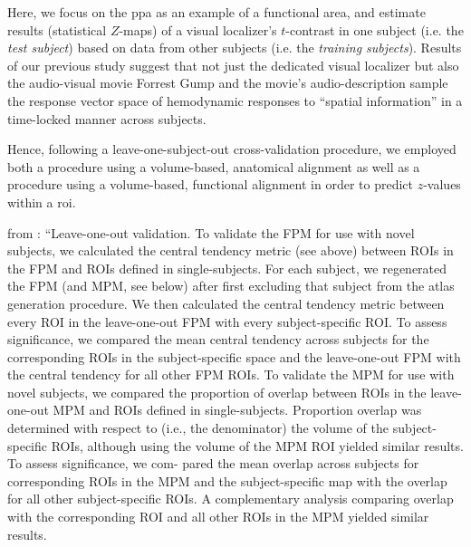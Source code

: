 

Here, we focus on the \ac{ppa} as an example of a functional area, and estimate
results (statistical $Z$-maps) of a visual localizer's $t$-contrast in one
subject (i.e. the \textit{test subject}) based on data from other subjects (i.e.
the \textit{training subjects}).
%
Results of our previous study \citep{haeusler2022processing} suggest that not
just the dedicated visual localizer \citep{sengupta2016extension} but also the
audio-visual movie Forrest Gump \citep{hanke2016simultaneous} and the movie's
audio-description \citep{hanke2014audiomovie} sample the response vector space
of hemodynamic responses to ``spatial information'' in a time-locked manner
across subjects.

%
Hence, following a leave-one-subject-out cross-validation procedure, we employed
both a procedure using a volume-based, anatomical alignment as well as a
procedure using a volume-based, functional alignment in order to predict
$z$-values within a \ac{roi}.


from \citet{wang2015probabilistic}: ``Leave-one-out validation. To validate the
FPM for use with novel subjects, we calculated the central tendency metric (see
above) between ROIs in the FPM and ROIs defined in single-subjects. For each
subject, we regenerated the FPM (and MPM, see below) after first excluding that
subject from the atlas generation procedure. We then calculated the central
tendency metric between every ROI in the leave-one-out FPM with every
subject-specific ROI. To assess significance, we compared the mean central
tendency across subjects for the corresponding ROIs in the subject-specific
space and the leave-one-out FPM with the central tendency for all other FPM
ROIs.
%
To validate the MPM for use with novel subjects, we compared the proportion of
overlap between ROIs in the leave-one-out MPM and ROIs defined in
single-subjects. Proportion overlap was determined with respect to (i.e., the
denominator) the volume of the subject-specific ROIs, although using the volume
of the MPM ROI yielded similar results. To assess significance, we com- pared
the mean overlap across subjects for corresponding ROIs in the MPM and the
subject-specific map with the overlap for all other subject-specific ROIs.  A
complementary analysis comparing overlap with the corresponding ROI and all
other ROIs in the MPM yielded similar results.


